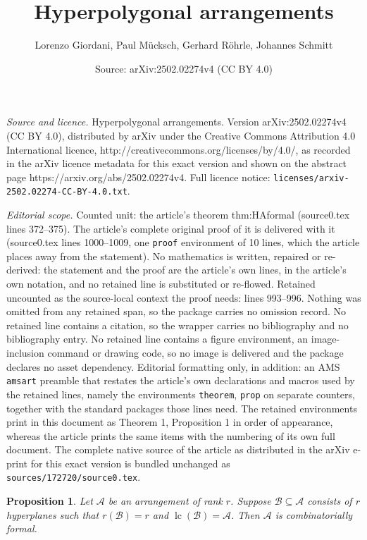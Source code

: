 \documentclass[10pt,a4paper]{amsart}
\title{Hyperpolygonal arrangements}
\author{Lorenzo Giordani, Paul M\"ucksch, Gerhard R\"ohrle, Johannes Schmitt}
\date{Source: arXiv:2502.02274v4 (CC BY 4.0)}
\newtheorem{prop}{Proposition}
\newcommand\CA{{\mathscr A}}
\newcommand\CB{{\mathscr B}}
\newcommand\lc{{\operatorname{lc}}}
\begin{document}
\maketitle

\noindent\emph{Source and licence.} Hyperpolygonal arrangements. Version arXiv:2502.02274v4 (CC BY 4.0), distributed by arXiv under the Creative Commons Attribution 4.0 International licence, http://creativecommons.org/licenses/by/4.0/, as recorded in the arXiv licence metadata for this exact version and shown on the abstract page https://arxiv.org/abs/2502.02274v4. Full licence notice: \texttt{licenses/arxiv-2502.02274-CC-BY-4.0.txt}.\par\smallskip

\noindent\textit{Editorial scope.} Counted unit: the article's theorem thm:HAformal (source0.tex lines 372--375). The article's complete original proof of it is delivered with it (source0.tex lines 1000--1009, one \texttt{proof} environment of 10 lines, which the article places away from the statement). No mathematics is written, repaired or re-derived: the statement and the proof are the article's own lines, in the article's own notation, and no retained line is substituted or re-flowed.  Retained uncounted as the source-local context the proof needs: lines 993--996.  Nothing was omitted from any retained span, so the package carries no omission record.  No retained line contains a citation, so the wrapper carries no bibliography and no bibliography entry.  No retained line contains a figure environment, an image-inclusion command or drawing code, so no image is delivered and the package declares no asset dependency.  Editorial formatting only, in addition: an AMS \texttt{amsart} preamble that restates the article's own declarations and macros used by the retained lines, namely the environments \texttt{theorem}, \texttt{prop} on separate counters, together with the standard packages those lines need.  The retained environments print in this document as Theorem 1, Proposition 1 in order of appearance, whereas the article prints the same items with the numbering of its own full document.  The complete native source of the article as distributed in the arXiv e-print for this exact version is bundled unchanged as \texttt{sources/172720/source0.tex}.
\begin{prop}
	\label{prop:lcbasis}
	Let $\CA$ be an arrangement of rank $r$. Suppose $\CB \subseteq \CA$ consists of $r$ hyperplanes such that $r(\CB)=r$ and $\lc(\CB)=\CA$. Then $\CA$ is combinatorially formal.
\end{prop}
\end{document}
